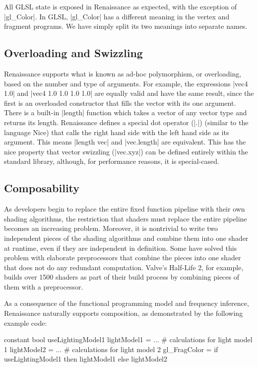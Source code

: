 \documentclass{acmsiggraph}               %
\begin{document}
All GLSL state is exposed in Renaissance as expected, with the
exception of |gl_Color|.  In GLSL, |gl_Color| has a different meaning
in the vertex and fragment programs.  We have simply split its two
meanings into separate names.


\subsection{Overloading and Swizzling}

Renaissance supports what is known as ad-hoc polymorphism, or
overloading, based on the number and type of arguments.  For example,
the expressions |vec4 1.0| and |vec4 1.0 1.0 1.0 1.0| are equally
valid and have the same result, since the first is an overloaded
constructor that fills the vector with its one argument.  There is a
built-in |length| function which takes a vector of any vector type and
returns its length.  Renaissance defines a special dot operator (|.|)
(similar to the language Nice) that calls the right hand side with the
left hand side as its argument.  This means |length vec| and
|vec.length| are equivalent.  This has the nice property that vector
swizzling (|vec.xyz|) can be defined entirely within the standard
library, although, for performance reasons, it is special-cased.


\subsection{Composability}

As developers begin to replace the entire fixed function pipeline with
their own shading algorithms, the restriction that shaders must
replace the entire pipeline becomes an increasing problem.  Moreover,
it is nontrivial to write two independent pieces of the shading
algorithms and combine them into one shader at runtime, even if they
are independent in definition.  Some have solved this problem with
elaborate preprocessors that combine the pieces into one shader that
does not do any redundant computation.  Valve's Half-Life 2, for
example, builds over 1500 shaders as part of their build process by
combining pieces of them with a preprocessor.

As a consequence of the functional programming model and frequency
inference, Renaissance naturally supports composition, as demonstrated
by the following example code:

\begin{MyVerb}
constant bool useLightingModel1
lightModel1 = ...  # calculations for light model 1
lightModel2 = ...  # calculations for light model 2
gl_FragColor = if useLightingModel1 then lightModel1 
                                    else lightModel2
\end{MyVerb}
\end{document}
